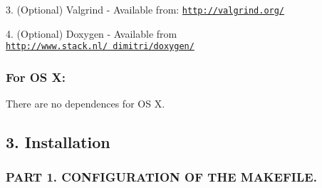 \begin{DoxyPre}3. (Optional) Valgrind - Available from: \href{http://valgrind.org/}{\tt http://valgrind.org/}\end{DoxyPre}



\begin{DoxyPre}4. (Optional) Doxygen - Available from \href{http://www.stack.nl/~dimitri/doxygen/}{\tt http://www.stack.nl/~dimitri/doxygen/}\end{DoxyPre}



\begin{DoxyPre}\subsubsection*{For OS X:}\end{DoxyPre}



\begin{DoxyPre}\end{DoxyPre}



\begin{DoxyPre}There are no dependences for OS X.


\end{DoxyPre}



\begin{DoxyPre}\subsection*{3. Installation}\end{DoxyPre}



\begin{DoxyPre}\end{DoxyPre}



\begin{DoxyPre}\subsubsection*{PART 1. CONFIGURATION OF THE MAKEFILE.}\end{DoxyPre}



\begin{DoxyPre}\end{DoxyPre}



